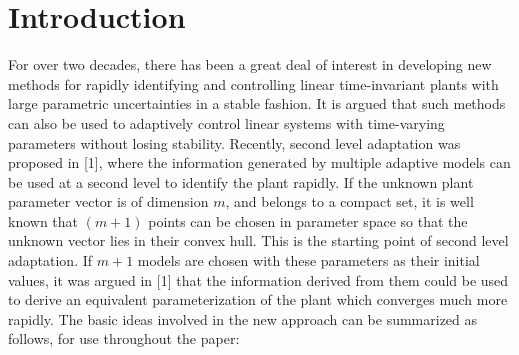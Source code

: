 \documentclass[conference]{IEEEtran}
\begin{document}
\section{Introduction}
For over two decades, there has been a great deal of interest in developing new methods for rapidly identifying and controlling linear time-invariant plants with large parametric uncertainties in a stable fashion. It is argued that such methods can also be used to adaptively control linear systems with time-varying parameters without losing stability. Recently, second level adaptation was proposed in [1], where the information generated by multiple adaptive models can be used at a second level to identify the plant rapidly. If the unknown plant parameter vector is of dimension $m$, and belongs to a compact set, it is well known that $(m+1)$ points can be chosen in parameter space so that the unknown vector lies in their convex hull. This is the starting point of second level adaptation. If $m+1$ models are chosen with these parameters as their initial values, it was argued in [1] that the information derived from them could be used to derive an equivalent parameterization of the plant which converges much more rapidly. The basic ideas involved in the new  approach can be summarized as follows, for use throughout the paper:
\end{document}
